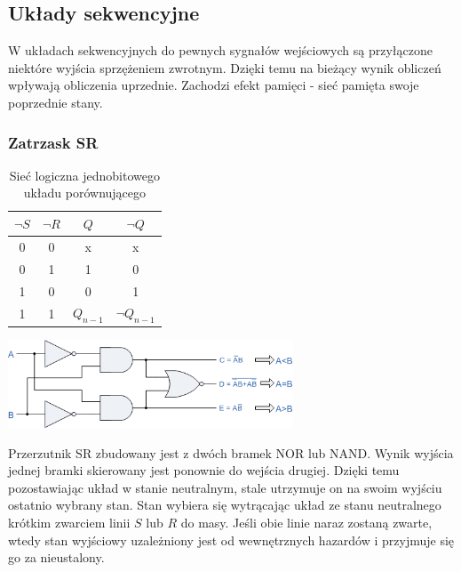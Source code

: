 \documentclass[a4paper,12pt]{article}
\begin{document}
\subsection{Układy sekwencyjne}

W układach sekwencyjnych do pewnych sygnałów wejściowych są przyłączone niektóre wyjścia sprzężeniem zwrotnym. Dzięki temu na bieżący wynik obliczeń wpływają obliczenia uprzednie. Zachodzi efekt pamięci - sieć pamięta swoje poprzednie stany.

\subsubsection{Zatrzask SR}

\begin{table}[h!]
\centering

\begin{minipage}{6.5cm}
\centering

\begin{tabular}{ | c | c || c | c | }
  \hline
  $\lnot S$ & $\lnot R$ & $Q$ & $\lnot Q$ \\ \hline
  0 & 0 & x & x \\
  0 & 1 & 1 & 0 \\
  1 & 0 & 0 & 1 \\
  1 & 1 & $Q_{n-1}$ & $\lnot Q_{n-1}$ \\
  \hline
\end{tabular}
\end{minipage}
\begin{minipage}{10cm}
   \includegraphics[width=8.5cm]{grafika/obwody/cmp.png}
   \caption*{Sieć logiczna jednobitowego układu porównującego}
\end{minipage}
\end{table}

Przerzutnik SR zbudowany jest z dwóch bramek NOR lub NAND. Wynik wyjścia jednej bramki skierowany jest ponownie do wejścia drugiej. Dzięki temu pozostawiając układ w stanie neutralnym, stale utrzymuje on na swoim wyjściu ostatnio wybrany stan. Stan wybiera się wytrącając układ ze stanu neutralnego krótkim zwarciem linii $S$ lub $R$ do masy. Jeśli obie linie naraz zostaną zwarte, wtedy stan wyjściowy uzależniony jest od wewnętrznych hazardów i przyjmuje się go za nieustalony.
\end{document}

